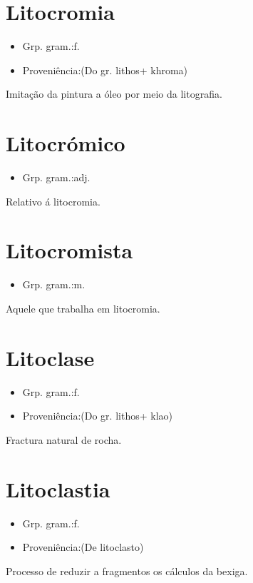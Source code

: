 \section{Litocromia}
\begin{itemize}
\item {Grp. gram.:f.}
\end{itemize}
\begin{itemize}
\item {Proveniência:(Do gr. \textunderscore lithos\textunderscore  + \textunderscore khroma\textunderscore )}
\end{itemize}
Imitação da pintura a óleo por meio da litografia.
\section{Litocrómico}
\begin{itemize}
\item {Grp. gram.:adj.}
\end{itemize}
Relativo á litocromia.
\section{Litocromista}
\begin{itemize}
\item {Grp. gram.:m.}
\end{itemize}
Aquele que trabalha em litocromia.
\section{Litoclase}
\begin{itemize}
\item {Grp. gram.:f.}
\end{itemize}
\begin{itemize}
\item {Proveniência:(Do gr. \textunderscore lithos\textunderscore  + \textunderscore klao\textunderscore )}
\end{itemize}
Fractura natural de rocha.
\section{Litoclastia}
\begin{itemize}
\item {Grp. gram.:f.}
\end{itemize}
\begin{itemize}
\item {Proveniência:(De \textunderscore litoclasto\textunderscore )}
\end{itemize}
Processo de reduzir a fragmentos os cálculos da bexiga.
